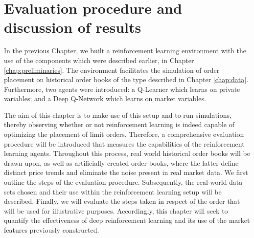 \chapter{Evaluation procedure and discussion of results}
\label{chap:analysis}

In the previous Chapter, we built a reinforcement learning environment with the use of the components which were described earlier, in Chapter \ref{chap:preliminaries}.
The environment facilitates the simulation of order placement on historical order books of the type described in Chapter \ref{chap:data}.
Furthermore, two agents were introduced: a Q-Learner which learns on private variables; and a Deep Q-Network which learns on market variables.

The aim of this chapter is to make use of this setup and to run simulations, thereby observing whether or not reinforcement learning is indeed capable of optimizing the placement of limit orders.
Therefore, a comprehensive evaluation procedure will be introduced that  measures the capabilities of the reinforcement learning agents.
Throughout this process, real world historical order books will be drawn upon, as well as artificially created order books, where the latter define distinct price trends and eliminate the noise present in real market data.
We first outline the steps of the evaluation procedure.
Subsequently, the real world data sets chosen and their use within the reinforcement learning setup will be described.
Finally, we will evaluate the steps taken in respect of the order that will be used for illustrative purposes.
Accordingly, this chapter will seek to quantify the effectiveness of deep reinforcement learning and its use of the market features previously constructed.

